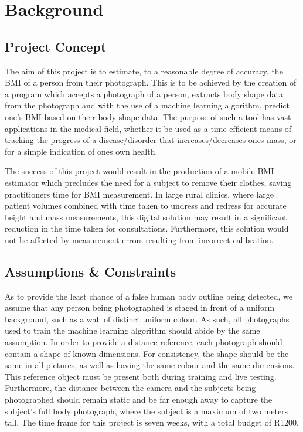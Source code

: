 \documentclass[conference]{IEEEtran}
\begin{document}
\section{Background}
\subsection{Project Concept}
The aim of this project is to estimate, to a reasonable degree of accuracy, the BMI of a person from their photograph.
This is to be achieved by the creation of a program which accepts a photograph of a person, extracts body shape data from the photograph and with the use of a machine learning algorithm, predict one's BMI based on their body shape data.
The purpose of such a tool has vast applications in the medical field, whether it be used as a time-efficient means of tracking the progress of a disease/disorder that increases/decreases ones mass, or for a simple indication of ones own health.

The success of this project would result in the production of a mobile BMI estimator which precludes the need for a subject to remove their clothes, saving practitioners time for BMI measurement.
In large rural clinics, where large patient volumes combined with time taken to undress and redress for accurate height and mass measurements, this digital solution may result in a significant reduction in the time taken for consultations.
Furthermore, this solution would not be affected by measurement errors resulting from incorrect calibration.
\subsection{Assumptions \& Constraints}
As to provide the least chance of a false human body outline being detected, we assume that any person being photographed is staged in front of a uniform background, such as a wall of distinct uniform colour.
As such, all photographs used to train the machine learning algorithm should abide by the same assumption.
In order to provide a distance reference, each photograph should contain a shape of known dimensions.
For consistency, the shape should be the same in all pictures, as well as having the same colour and the same dimensions.
This reference object must be present both during training and live testing.
Furthermore, the distance between the camera and the subjects being photographed should remain static and be far enough away to capture the subject's full body photograph, where the subject is a maximum of two meters tall.
The time frame for this project is seven weeks, with a total budget of R1200.
\end{document}
